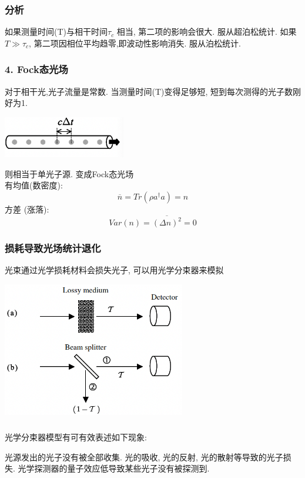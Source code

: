 \begin{frame}  
 \frametitle{分析}
 \begin{itemize}
     \Item 如果测量时间(T)与相干时间$\tau_c$ 相当, 第二项的影响会很大. 服从超泊松统计.
     \Item 如果$T\gg \tau_c$, 第二项因相位平均趋零,即波动性影响消失. 服从泊松统计.
 \end{itemize}    
\end{frame}

\begin{frame} 
 \frametitle{4. Fock态光场}
 对于相干光,光子流量是常数. 当测量时间(T)变得足够短, 短到每次测得的光子数刚好为1. 
   \begin{center}
        \includegraphics[width=0.4\textwidth]{figs/2022-05-07-14-58-04.png}
   \end{center}
 则相当于单光子源. 变成Fock态光场 \\
 有均值(数密度):
 \[ \overline{n}= Tr(\rho a^{\dagger} a)= n\] 
 方差 (涨落): 
 \[ Var(n) = \overline{(\Delta n)^2} =0 \]
\end{frame}

\begin{frame} 
 \frametitle{损耗导致光场统计退化}
    光束通过光学损耗材料会损失光子, 可以用光学分束器来模拟
      \begin{center}
           \includegraphics[width=0.6\textwidth]{figs/2022-05-07-15-10-50.png}
      \end{center}      
\end{frame}

\begin{frame} 
 \frametitle{}
    光学分束器模型有可有效表述如下现象:
 \begin{itemize}
    \Item 光源发出的光子没有被全部收集.
    \Item 光的吸收, 光的反射, 光的散射等导致的光子损失.
    \Item 光学探测器的量子效应低导致某些光子没有被探测到.
\end{itemize} 
\end{frame}

